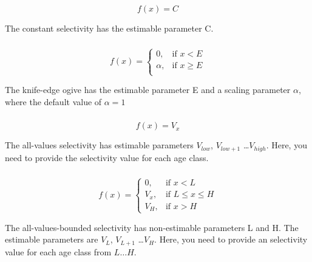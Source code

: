 \begin{equation}
f(x)=C
\end{equation}

The constant selectivity has the estimable parameter C. 

\subsubsection[Knife-edge]{}

\begin{equation}
f(x)= \begin{cases}
  0, & \text{if $x < E$} \\
  \alpha, & \text{if $x \ge E$}\\ 
  \end{cases} 
\end{equation}

The knife-edge ogive has the estimable parameter E and a scaling parameter $\alpha$, where the default value of $\alpha = 1$

\subsubsection[All-values]{}

\begin{equation}
f(x)=V_x
\end{equation}

The all-values selectivity has estimable parameters $V_{low}$, $V_{low+1}$ \ldots $V_{high}$. Here, you need to provide the selectivity value for each age class.

\subsubsection[All-values-bounded]{}

\begin{equation}
f(x)=\begin{cases}
		 0, & \text{if $x < L$} \\
		 V_x, & \text{if $L \le x \le H$} \\
		 V_H, & \text{if $x > H$}
  \end{cases}
\end{equation}

The all-values-bounded selectivity has non-estimable parameters L and H. The estimable parameters are $V_L$, $V_{L+1}$ \ldots $V_H$. Here, you need to provide an selectivity value for each age class from $L \ldots H$.

